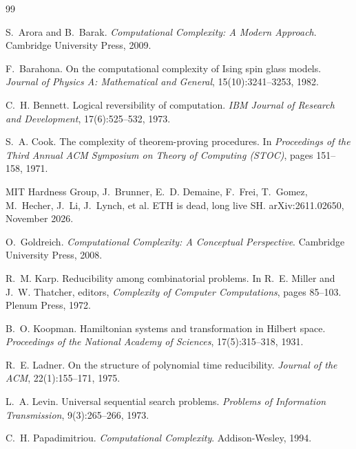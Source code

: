 \begin{thebibliography}{99}

S.~Arora and B.~Barak.
\newblock \emph{Computational Complexity: A Modern Approach}.
\newblock Cambridge University Press, 2009.

F.~Barahona.
\newblock On the computational complexity of Ising spin glass models.
\newblock \emph{Journal of Physics A: Mathematical and General}, 15(10):3241--3253, 1982.

C.~H. Bennett.
\newblock Logical reversibility of computation.
\newblock \emph{IBM Journal of Research and Development}, 17(6):525--532, 1973.

S.~A. Cook.
\newblock The complexity of theorem-proving procedures.
\newblock In \emph{Proceedings of the Third Annual ACM Symposium on Theory of Computing (STOC)},
pages 151--158, 1971.

MIT Hardness Group, J.~Brunner, E.~D. Demaine, F.~Frei, T.~Gomez, M.~Hecher, J.~Li, J.~Lynch, et al.
\newblock ETH is dead, long live SH.
\newblock arXiv:2611.02650, November 2026.

O.~Goldreich.
\newblock \emph{Computational Complexity: A Conceptual Perspective}.
\newblock Cambridge University Press, 2008.

R.~M. Karp.
\newblock Reducibility among combinatorial problems.
\newblock In R.~E. Miller and J.~W. Thatcher, editors, \emph{Complexity of Computer
Computations}, pages 85--103. Plenum Press, 1972.

B.~O. Koopman.
\newblock Hamiltonian systems and transformation in Hilbert space.
\newblock \emph{Proceedings of the National Academy of Sciences}, 17(5):315--318, 1931.

R.~E. Ladner.
\newblock On the structure of polynomial time reducibility.
\newblock \emph{Journal of the ACM}, 22(1):155--171, 1975.

L.~A. Levin.
\newblock Universal sequential search problems.
\newblock \emph{Problems of Information Transmission}, 9(3):265--266, 1973.

C.~H. Papadimitriou.
\newblock \emph{Computational Complexity}.
\newblock Addison-Wesley, 1994.













\end{thebibliography}
